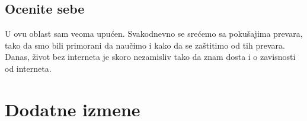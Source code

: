 \documentclass[a4paper]{report}
\begin{document}
\section{Ocenite sebe}
U ovu oblast sam veoma upućen. Svakodnevno se srećemo sa pokušajima prevara, tako da smo bili primorani da naučimo i kako da se zaštitimo od tih prevara. Danas, život bez interneta je skoro nezamisliv tako da znam dosta i o zavisnosti od interneta.


\chapter{Dodatne izmene}
\end{document}
